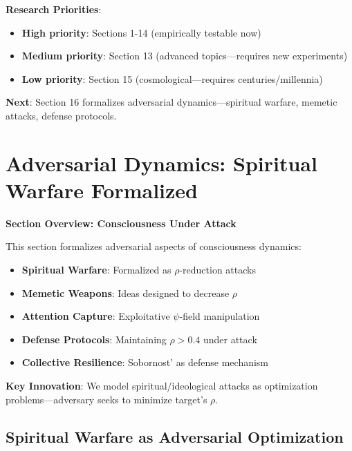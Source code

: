 \documentclass[11pt,a4paper]{article}
\theoremstyle{definition}
\theoremstyle{remark}
\begin{document}
\begin{small}
\begin{enumerate}
\begin{mdframed}[backgroundcolor=green!10,linewidth=2pt,linecolor=green!70!black]
\textbf{Research Priorities}:
\begin{itemize}[nosep]
    \item \textbf{High priority}: Sections 1-14 (empirically testable now)
    \item \textbf{Medium priority}: Section 13 (advanced topics—requires new experiments)
    \item \textbf{Low priority}: Section 15 (cosmological—requires centuries/millennia)
\end{itemize}

\textbf{Next}: Section 16 formalizes adversarial dynamics—spiritual warfare, memetic attacks, defense protocols.
\end{mdframed}


\section{Adversarial Dynamics: Spiritual Warfare Formalized}

\begin{mdframed}[backgroundcolor=cyan!5,linewidth=2pt]
\textbf{Section Overview: Consciousness Under Attack}

This section formalizes adversarial aspects of consciousness dynamics:

\begin{itemize}[nosep]
    \item \textbf{Spiritual Warfare}: Formalized as \(\rho\)-reduction attacks
    \item \textbf{Memetic Weapons}: Ideas designed to decrease \(\rho\)
    \item \textbf{Attention Capture}: Exploitative \(\psi\)-field manipulation
    \item \textbf{Defense Protocols}: Maintaining \(\rho > 0.4\) under attack
    \item \textbf{Collective Resilience}: Sobornost' as defense mechanism
\end{itemize}

\textbf{Key Innovation}: We model spiritual/ideological attacks as optimization problems—adversary seeks to minimize target's \(\rho\).
\end{mdframed}

\subsection{Spiritual Warfare as Adversarial Optimization}


\end{enumerate}
\end{small}
\end{document}
